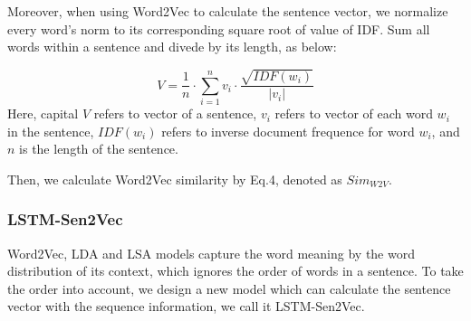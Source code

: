 \documentclass{sig-alternate}
\begin{document}
Moreover, when using Word2Vec to calculate the sentence vector, we normalize every 
word's norm to its corresponding square root of value of IDF. Sum all words within a sentence and divede by its length, as below:

\begin{equation}
   V = \frac{1}{n} \cdot \sum_{i=1}^n v_i \cdot \frac{\sqrt{IDF(w_i)}}{|v_i|} 
\end{equation}
Here, capital $V$ refers to vector of a sentence, $v_i$ refers to vector of each word $w_i$ in the sentence, $IDF(w_i)$ refers to inverse document frequence for word $w_i$, and $n$ is the length of the sentence.

Then, we calculate Word2Vec similarity by Eq.4, denoted as $Sim_{W2V}$.

\subsubsection{LSTM-Sen2Vec}
Word2Vec, LDA and LSA models capture the word meaning by the word distribution 
of its context, which ignores the order of words in a sentence. To take the order 
into account, we design a new model which can calculate the sentence vector 
with the sequence information, we call it LSTM-Sen2Vec.
\end{document}
